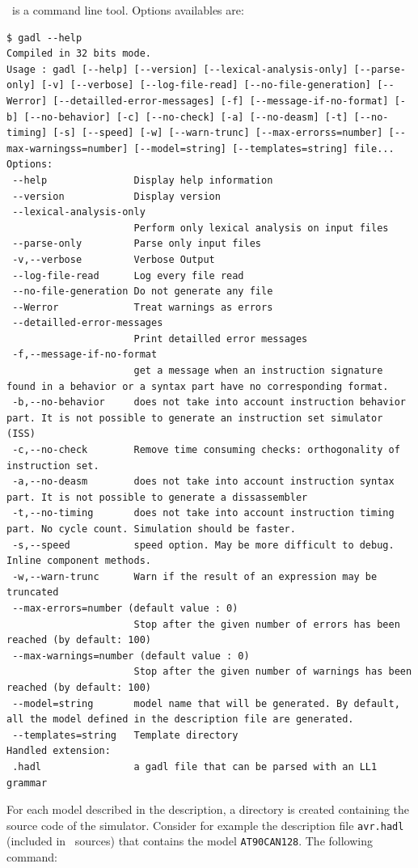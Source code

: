 \gadl\ is a command line tool. Options availables are:
\begin{verbatim}
$ gadl --help
Compiled in 32 bits mode.
Usage : gadl [--help] [--version] [--lexical-analysis-only] [--parse-only] [-v] [--verbose] [--log-file-read] [--no-file-generation] [--Werror] [--detailled-error-messages] [-f] [--message-if-no-format] [-b] [--no-behavior] [-c] [--no-check] [-a] [--no-deasm] [-t] [--no-timing] [-s] [--speed] [-w] [--warn-trunc] [--max-errorss=number] [--max-warningss=number] [--model=string] [--templates=string] file...
Options:
 --help               Display help information
 --version            Display version
 --lexical-analysis-only
                      Perform only lexical analysis on input files
 --parse-only         Parse only input files
 -v,--verbose         Verbose Output
 --log-file-read      Log every file read
 --no-file-generation Do not generate any file
 --Werror             Treat warnings as errors
 --detailled-error-messages
                      Print detailled error messages
 -f,--message-if-no-format
                      get a message when an instruction signature found in a behavior or a syntax part have no corresponding format.
 -b,--no-behavior     does not take into account instruction behavior part. It is not possible to generate an instruction set simulator (ISS)
 -c,--no-check        Remove time consuming checks: orthogonality of instruction set.
 -a,--no-deasm        does not take into account instruction syntax part. It is not possible to generate a dissassembler
 -t,--no-timing       does not take into account instruction timing part. No cycle count. Simulation should be faster.
 -s,--speed           speed option. May be more difficult to debug. Inline component methods.
 -w,--warn-trunc      Warn if the result of an expression may be truncated
 --max-errors=number (default value : 0)
                      Stop after the given number of errors has been reached (by default: 100)
 --max-warnings=number (default value : 0)
                      Stop after the given number of warnings has been reached (by default: 100)
 --model=string       model name that will be generated. By default, all the model defined in the description file are generated.
 --templates=string   Template directory
Handled extension:
 .hadl                a gadl file that can be parsed with an LL1 grammar
\end{verbatim}

For each model described in the description, a directory is created containing the source code of the simulator. Consider for example the description file \texttt{avr.hadl} (included in \gadl\ sources) that contains the model \texttt{AT90CAN128}. The following command:

